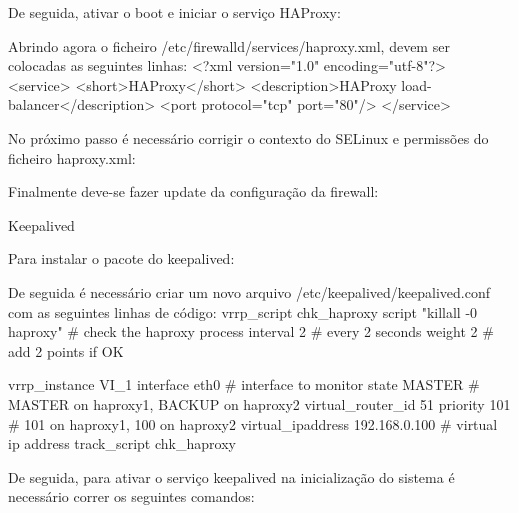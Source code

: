 De seguida, ativar o boot e iniciar o serviço HAProxy:
 \par
{} \par
{} \par

Abrindo agora o ficheiro /etc/firewalld/services/haproxy.xml, devem ser colocadas as seguintes linhas:
<?xml version="1.0" encoding="utf-8"?>
<service>
<short>HAProxy</short>
<description>HAProxy load-balancer</description>
<port protocol="tcp" port="80"/>
</service>

No próximo passo é necessário corrigir o contexto do SELinux e permissões do ficheiro haproxy.xml:
 \par
{} \par
{} \par

Finalmente deve-se fazer update da configuração da firewall:
 \par
{} \par

Keepalived

Para instalar o pacote do keepalived:
 \par

De seguida é necessário criar um novo arquivo /etc/keepalived/keepalived.conf com as seguintes linhas de código:
vrrp_script chk_haproxy {
  script "killall -0 haproxy" # check the haproxy process
  interval 2 # every 2 seconds
  weight 2 # add 2 points if OK
}

vrrp_instance VI_1 {
  interface eth0 # interface to monitor
  state MASTER # MASTER on haproxy1, BACKUP on haproxy2
  virtual_router_id 51
  priority 101 # 101 on haproxy1, 100 on haproxy2
  virtual_ipaddress {
    192.168.0.100 # virtual ip address 
  }
  track_script {
    chk_haproxy
  }
}

De seguida, para ativar o serviço keepalived na inicialização do sistema é necessário correr os seguintes comandos:
 \par
{} \par

